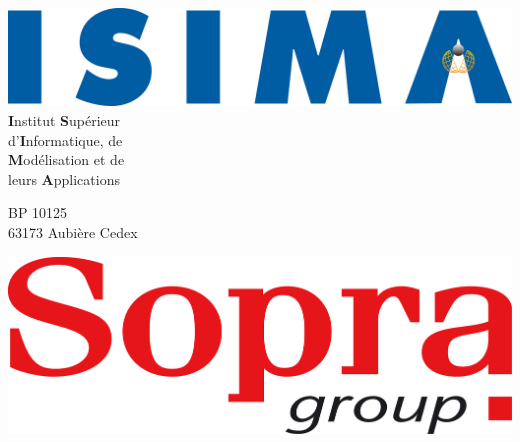 \thispagestyle{empty}

\makeatletter %



\begin{multicols}{2}
	\begin{flushleft}
	
	
		\includegraphics[scale=0.09]{img/ISIMA_logo.png}					\\
		
		\textbf{I}nstitut \textbf{S}upérieur								\\
		d'\textbf{I}nformatique, de											\\
		\textbf{M}odélisation et de											\\
		leurs \textbf{A}pplications	
		
		\vspace*{0.5cm}
		
		BP 10125															\\
		63173 Aubière Cedex
		
		
	\end{flushleft}
\columnbreak
	\begin{flushright}
	
		
		\includegraphics[scale=0.07]{img/SopraGroupe_Logo.png}				\\
		

\end{flushright}
\end{multicols}
